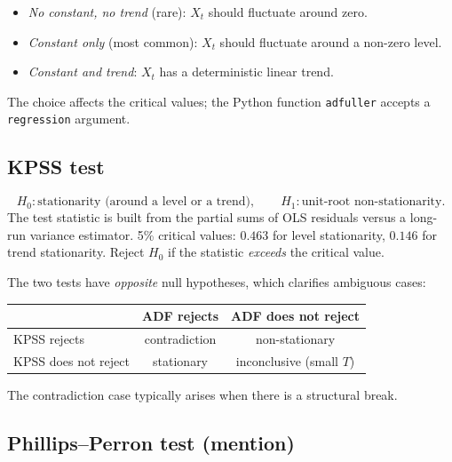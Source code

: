 \begin{rembox}
\begin{itemize}
  \item \emph{No constant, no trend} (rare): $X_t$ should fluctuate
        around zero.
  \item \emph{Constant only} (most common): $X_t$ should fluctuate
        around a non-zero level.
  \item \emph{Constant and trend}: $X_t$ has a deterministic linear
        trend.
\end{itemize}
The choice affects the critical values; the Python function
\texttt{adfuller} accepts a \texttt{regression} argument.
\end{rembox}

\subsection{KPSS test}

\begin{defbox}
\label{def:kpss}
\[
  H_0 : \text{stationarity (around a level or a trend)},
  \qquad
  H_1 : \text{unit-root non-stationarity}.
\]
The test statistic is built from the partial sums of OLS residuals
versus a long-run variance estimator. 5\% critical values: $0.463$
for level stationarity, $0.146$ for trend stationarity. Reject $H_0$
if the statistic \emph{exceeds} the critical value.
\end{defbox}

\begin{rembox}
The two tests have \emph{opposite} null hypotheses, which clarifies
ambiguous cases:
\begin{center}
\begin{tabular}{l|cc}
                              & ADF rejects        & ADF does not reject \\
\hline
KPSS rejects                  & contradiction      & non-stationary \\
KPSS does not reject          & stationary         & inconclusive (small $T$) \\
\end{tabular}
\end{center}
The contradiction case typically arises when there is a structural
break.
\end{rembox}

\subsection{Phillips--Perron test (mention)}

